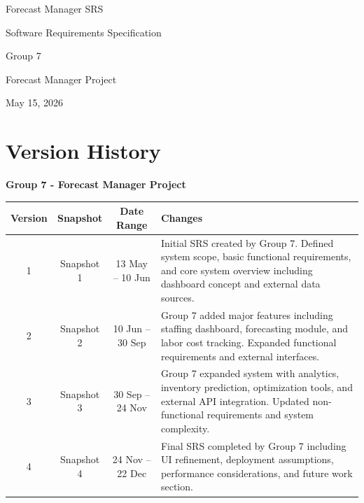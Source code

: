\documentclass[12pt]{report}
\begin{document}
\begin{titlepage}
\centering
\vspace*{1in}

{\Huge Forecast Manager SRS \par}
\vspace{0.5in}

{\Large Software Requirements Specification \par}
\vspace{1in}

{\Large Group 7 \par}
\vspace{0.5in}

{\large Forecast Manager Project \par}
\vfill

{\large May 15, 2026 \par}
\end{titlepage}


\clearpage
{} 


\tableofcontents
\clearpage


\section*{Version History}

\textbf{Group 7 - Forecast Manager Project}

\begin{longtable}{|c|c|c|p{8cm}|}
\hline
Version & Snapshot & Date Range & Changes \\ \hline
1 & Snapshot 1 & 13 May -- 10 Jun &
Initial SRS created by Group 7. Defined system scope, basic functional requirements, and core system overview including dashboard concept and external data sources. \\ \hline
2 & Snapshot 2 & 10 Jun -- 30 Sep &
Group 7 added major features including staffing dashboard, forecasting module, and labor cost tracking. Expanded functional requirements and external interfaces. \\ \hline
3 & Snapshot 3 & 30 Sep -- 24 Nov &
Group 7 expanded system with analytics, inventory prediction, optimization tools, and external API integration. Updated non-functional requirements and system complexity. \\ \hline
4 & Snapshot 4 & 24 Nov -- 22 Dec &
Final SRS completed by Group 7 including UI refinement, deployment assumptions, performance considerations, and future work section. \\ \hline
\end{longtable}
\end{document}
